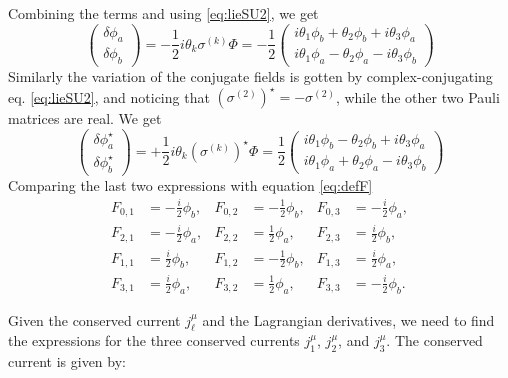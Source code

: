 Combining the terms and using \eqref{eq:lieSU2}, we get
\[
\begin{pmatrix}
    \delta \phi_a \\
    \delta \phi_b 
\end{pmatrix}
=
-\frac{1}{2}i \theta_k \sigma^{(k)} \Phi = -\frac{1}{2}\begin{pmatrix} i \theta_1 \phi_b + \theta_2 \phi_b + i \theta_3 \phi_a \\ i \theta_1 \phi_a - \theta_2 \phi_a - i \theta_3 \phi_b \end{pmatrix}
\]
Similarly the variation of the conjugate fields is gotten by complex-conjugating eq. \eqref{eq:lieSU2}, and noticing that  $(\sigma^{(2)})^\star=-\sigma^{(2)}$, while the other two Pauli matrices are real. We get
\begin{equation*}
    \begin{pmatrix}
    \delta \phi_a^\star \\
    \delta \phi_b ^\star
\end{pmatrix}
=
+\frac{1}{2}i \theta_k( \sigma^{(k)} )^\star \Phi = \frac{1}{2}\begin{pmatrix} i \theta_1 \phi_b - \theta_2 \phi_b + i \theta_3 \phi_a \\ i \theta_1 \phi_a + \theta_2 \phi_a - i \theta_3 \phi_b \end{pmatrix}
\end{equation*}
Comparing the last two expressions with equation \eqref{eq:defF}
\begin{align}
F_{0,1} &= -\frac{i}{2} \phi_b, & F_{0,2} &= -\frac{1}{2} \phi_b, & F_{0,3} &= -\frac{i}{2} \phi_a, \\
F_{2,1} &= -\frac{i}{2} \phi_a, & F_{2,2} &= \frac{1}{2} \phi_a, & F_{2,3} &= \frac{i}{2} \phi_b, \\
F_{1,1} &= \frac{i}{2} \phi_b, & F_{1,2} &= -\frac{1}{2} \phi_b, & F_{1,3} &= \frac{i}{2} \phi_a, \\
F_{3,1} &= \frac{i}{2} \phi_a, & F_{3,2} &= \frac{1}{2} \phi_a, & F_{3,3} &= -\frac{i}{2} \phi_b.
\end{align}

   
Given the conserved current \( j^\mu_\ell \) and the Lagrangian derivatives, we need to find the expressions for the three conserved currents \( j^\mu_1 \), \( j^\mu_2 \), and \( j^\mu_3 \). The conserved current is given by:

